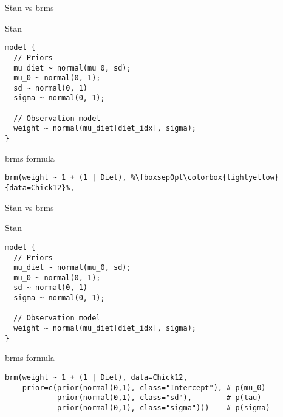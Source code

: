\documentclass[finnish,english,t]{beamer}
\begin{document}
\begin{frame}[fragile]{Stan vs brms}

  \vspace{-0.5\baselineskip}

  Stan
  
\vspace{-0.5\baselineskip}
{\small
\begin{verbatim}
model {
  // Priors
  mu_diet ~ normal(mu_0, sd);
  mu_0 ~ normal(0, 1);
  sd ~ normal(0, 1)
  sigma ~ normal(0, 1);
  
  // Observation model
  weight ~ normal(mu_diet[diet_idx], sigma);
}
\end{verbatim}

  brms formula
  \vspace{-0.5\baselineskip}
\begin{verbatim}
brm(weight ~ 1 + (1 | Diet), %\fboxsep0pt\colorbox{lightyellow}{data=Chick12}%,
\end{verbatim}
}

\end{frame}

\begin{frame}[fragile]{Stan vs brms}

  \vspace{-0.5\baselineskip}

  Stan
  
\vspace{-0.5\baselineskip}
{\small
\begin{verbatim}
model {
  // Priors
  mu_diet ~ normal(mu_0, sd);
  mu_0 ~ normal(0, 1);
  sd ~ normal(0, 1)
  sigma ~ normal(0, 1);
  
  // Observation model
  weight ~ normal(mu_diet[diet_idx], sigma);
}
\end{verbatim}

  brms formula
  \vspace{-0.5\baselineskip}
\begin{verbatim}
brm(weight ~ 1 + (1 | Diet), data=Chick12,
    prior=c(prior(normal(0,1), class="Intercept"), # p(mu_0)
            prior(normal(0,1), class="sd"),        # p(tau)
            prior(normal(0,1), class="sigma")))    # p(sigma)
\end{verbatim}
}

\end{frame}
\end{document}
